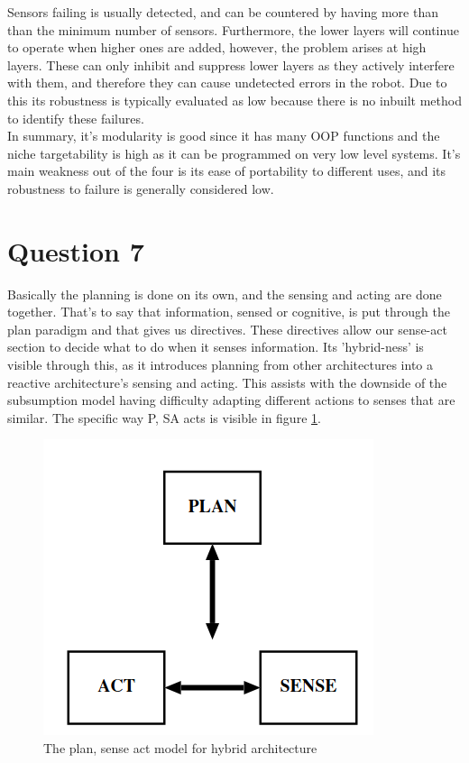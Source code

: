 \documentclass{article}
\newcommand\tab[1][1cm]{\hspace*{#1}}
\begin{document}
Sensors failing is usually detected, and can be countered by having 
more than than the minimum number of sensors. 
Furthermore, the lower layers will continue to operate when higher ones
are added, however, the problem arises at high layers. 
These can only inhibit and suppress lower layers as they actively
interfere with them, and therefore they can cause undetected 
errors in the robot. Due to this its robustness is typically
evaluated as low because there is no inbuilt method to identify 
these failures. \cite{IntroToAI} \cite{reactiveParadigms}
\\
\tab In summary, it's modularity is good since it has many OOP functions and the niche targetability is high as it can be programmed
on very low level systems. 
It's main weakness out of the four is its ease of portability to different uses, and its robustness to failure
is generally considered low.

\newpage
\section*{Question 7}

Basically the planning is done on its own, and the sensing and acting are done together. That's to say that information,
sensed or cognitive, is put through the plan paradigm and that gives us directives. These directives allow our sense-act
section to decide what to do when it senses information. Its 'hybrid-ness' is visible through this, as it introduces
planning from other architectures into a reactive architecture's sensing and acting.
This assists with the downside of the subsumption model having difficulty adapting different actions 
to senses that are similar. The specific way P, SA acts is visible in figure \ref{HybridPSA}.
\begin{figure}[ht]
    \centering
    \includegraphics[scale=0.5]{img/PSA-Hybrid.png}
    \caption{The plan, sense act model for hybrid architecture}
    \label{HybridPSA}
\end{figure}
\end{document}
